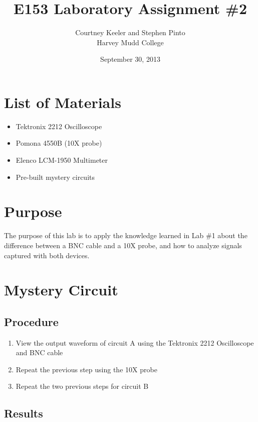 \documentclass[12pt,letterpaper]{report}
\begin{document}
\title{E153 Laboratory Assignment \#2}
\author{Courtney Keeler and Stephen Pinto\\
Harvey Mudd College}
\date{September 30, 2013}
\maketitle

\section*{List of Materials}
\begin{itemize}
	\item Tektronix 2212 Oscilloscope
	\item Pomona 4550B (10X probe)
	\item Elenco LCM-1950 Multimeter
	\item Pre-built mystery circuits
\end{itemize}

\section*{Purpose}
The purpose of this lab is to apply the knowledge learned in Lab \#1 about the difference between a BNC cable and a 10X probe, and how to analyze signals captured with both devices.

\section*{Mystery Circuit}
\subsection*{Procedure}
\begin{enumerate}
\item View the output waveform of circuit A using the Tektronix 2212 Oscilloscope and BNC cable
\item Repeat the previous step using the 10X probe
\item Repeat the two previous steps for circuit B
\end{enumerate}

\subsection*{Results}
\end{document}
